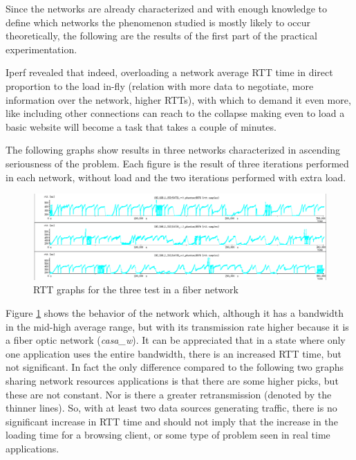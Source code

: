 Since the networks are already characterized and with enough knowledge to
define which networks the phenomenon studied  is mostly likely to occur
theoretically, the following are the results of the first part of the
practical experimentation.

Iperf revealed that indeed, overloading a network average RTT time in direct
proportion to the load in-fly (relation with more data to negotiate, more
information over the network, higher RTTs), with which to demand it even more,
like including other connections can reach to the collapse making even to load
a basic website will become a task that takes a couple of minutes.

The following graphs show results in three networks characterized in ascending
seriousness of the problem. Each figure is the result of three iterations
performed in each network, without load and the two iterations performed with
extra load.

\begin{figure}[ht]
\centering
    \includegraphics[width=\textwidth]{img/n_iperf_good}
\caption[Iperf: RTT graphs for a fiber network]{RTT graphs for the three test in a fiber network}
\label{fig:iperfgood}
\end{figure}%

Figure \ref{fig:iperfgood} shows the behavior of the network which, although it
has a bandwidth in the mid-high average range, but with its transmission rate
higher because it is a fiber optic network (\emph{casa\_w}). It can be
appreciated that in a state where only one application uses the entire
bandwidth, there is an increased RTT time, but not significant. In fact the
only difference compared to the following two graphs sharing network resources
applications is that there are some higher picks, but these are not constant.
Nor is there a greater retransmission (denoted by the thinner lines). So, with
at least two data sources generating traffic, there is no significant increase
in RTT time and should not imply that the increase in the loading time for a
browsing client, or some type of problem seen in real time applications.

